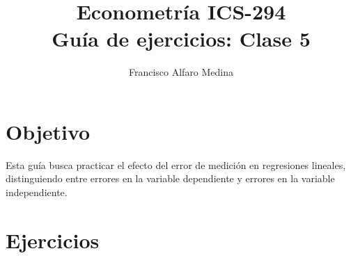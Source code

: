 \documentclass[11pt]{article}
\title{Econometría ICS-294\\Guía de ejercicios: Clase 5}
\author{Francisco Alfaro Medina}
\date{}
\begin{document}
\maketitle

\section*{Objetivo}

Esta guía busca practicar el efecto del error de medición en regresiones lineales, distinguiendo entre errores en la variable dependiente y errores en la variable independiente.

\section*{Ejercicios}
\end{document}
